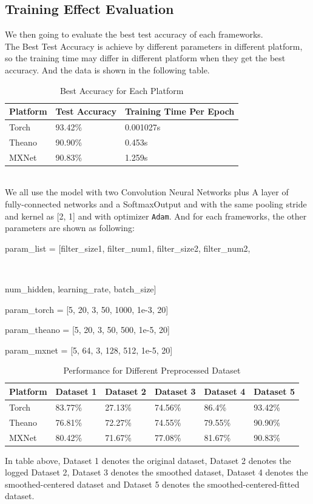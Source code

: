 \documentclass[12pt]{article}
\begin{document}
\subsection{Training Effect Evaluation}
We then going to evaluate the best test accuracy of each frameworks.\\
The Best Test Accuracy is achieve by different parameters in different platform, so the training time may differ in different platform when they get the best accuracy. And the data is shown in the following table.
\\
\begin{table}[!h]
	\caption {Best Accuracy for Each Platform} \label{tab:title} 
	\begin{center}
		\begin{tabular}{|l|l|l|}
			\hline
			Platform & Test Accuracy & Training Time Per Epoch\\
			\hline
			Torch & 93.42\% & 0.001027s \\
			\hline
			Theano & 90.90\% & 0.453s \\
			\hline
			MXNet & 90.83\% & 1.259s \\
			\hline
		\end{tabular}
	\end{center}
\end{table}
\\
We all use the model with two Convolution Neural Networks plus A layer of fully-connected networks and a SoftmaxOutput and with the same pooling stride and kernel as [2, 1] and with optimizer \texttt{Adam}. 
And for each frameworks, the other parameters are shown as following:\\
\centerline{param\_list = [filter\_size1, filter\_num1, filter\_size2, filter\_num2,}\\
 \centerline{num\_hidden, learning\_rate, batch\_size]}
 \centerline{param\_torch = [5, 20, 3, 50, 1000, 1e-3, 20]}
 \centerline{param\_theano = [5, 20, 3, 50, 500, 1e-5, 20]}
 \centerline{param\_mxnet = [5, 64, 3, 128, 512, 1e-5, 20]}


\begin{table}[!h]
	\caption {Performance for Different Preprocessed Dataset} \label{tab:title} 
		\begin{center}
		\begin{tabular}{|l|l|l|l|l|l|}
			\hline
			Platform & Dataset 1 & Dataset 2 & Dataset 3 & Dataset 4 & Dataset 5\\
			\hline
			Torch & 83.77\% & 27.13\% & 74.56\% & 86.4\% & 93.42\%  \\
			\hline
			Theano & 76.81\% & 72.27\% & 74.55\% &  79.55\% & 90.90\% \\
			\hline
			MXNet & 80.42\% & 71.67\% & 77.08\% & 81.67\% & 90.83\% \\
			\hline
		\end{tabular}
		\end{center}
		In table above, Dataset 1 denotes the original dataset, Dataset 2 denotes the logged Dataset 2, Dataset 3 denotes the smoothed dataset, Dataset 4 denotes the smoothed-centered dataset and Dataset 5 denotes the smoothed-centered-fitted dataset. 

\end{table} 
\end{document}

